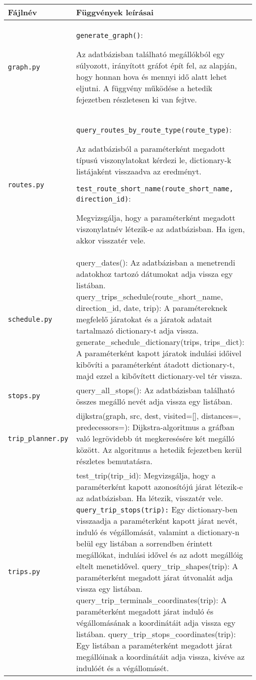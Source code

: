 \begin{longtable}{|p{4.5cm}|p{9cm}|}
\hline
\textbf{Fájlnév} & \textbf{Függvények leírásai} \\
\hline
\texttt{graph.py} &
\texttt{generate\_graph()}:

Az adatbázisban található megállókból egy súlyozott, irányított gráfot épít fel, az alapján, hogy honnan hova és mennyi idő alatt lehet eljutni. A függvény működése a hetedik fejezetben részletesen ki van fejtve.
\\
\hline
\texttt{routes.py} &
\texttt{query\_routes\_by\_route\_type(route\_type)}:

Az adatbázisból a paraméterként megadott típusú viszonylatokat kérdezi le, dictionary-k listájaként visszaadva az eredményt.

\bigskip

\texttt{test\_route\_short\_name(route\_short\_name, direction\_id)}:

Megvizsgálja, hogy a paraméterként megadott viszonylatnév létezik-e az adatbázisban. Ha igen, akkor visszatér vele.
\\
\hline
\texttt{schedule.py} &
query\_dates():
Az adatbázisban a menetrendi adatokhoz tartozó dátumokat adja vissza egy listában.
query\_trips\_schedule(route\_short\_name, direction\_id, date, trip):
A paramétereknek megfelelő járatokat és a járatok adatait tartalmazó dictionary-t adja vissza.
generate\_schedule\_dictionary(trips, trips\_dict):
A paraméterként kapott járatok indulási időivel kibővíti a paraméterként átadott dictionary-t, majd ezzel a kibővített dictionary-vel tér vissza. \\
\hline
\texttt{stops.py} &
query\_all\_stops():
Az adatbázisban található összes megálló nevét adja vissza egy listában. \\
\hline
\texttt{trip\_planner.py} &
dijkstra(graph, src, dest, visited=[], distances={}, predecessors={}):
Dijkstra-algoritmus a gráfban való legrövidebb út megkeresésére két megálló között. Az algoritmus a hetedik fejezetben kerül részletes bemutatásra. \\
\hline
\texttt{trips.py} &
test\_trip(trip\_id):
Megvizsgálja, hogy a paraméterként kapott azonosítójú járat létezik-e az adatbázisban. Ha létezik, visszatér vele.
\texttt{query\_trip\_stops(trip):}
Egy dictionary-ben visszaadja a paraméterként kapott járat nevét, induló és végállomását, valamint a dictionary-n belül egy listában a sorrendben érintett megállókat, indulási idővel és az adott megállóig eltelt menetidővel.
query\_trip\_shapes(trip):
A paraméterként megadott járat útvonalát adja vissza egy listában.
query\_trip\_terminals\_coordinates(trip):
A paraméterként megadott járat induló és végállomásának a koordinátáit adja vissza egy listában.
query\_trip\_stops\_coordinates(trip):
Egy listában a paraméterként megadott járat megállóinak a koordinátáit adja vissza, kivéve az indulóét és a végállomásét. \\
\hline
\end{longtable}

